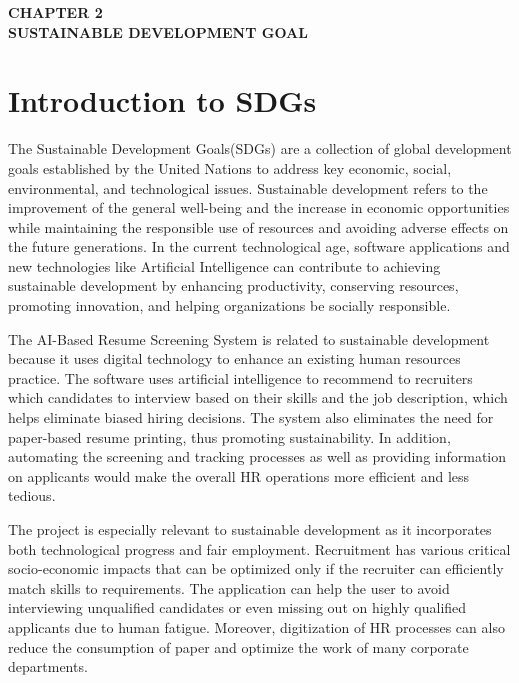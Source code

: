 \documentclass[12pt,a4paper]{report}
\begin{document}
\begin{center}
    {\fontsize{14pt}{17pt}\selectfont\textbf{CHAPTER 2}}\\[1cm]
    {\fontsize{14pt}{17pt}\selectfont\textbf{SUSTAINABLE DEVELOPMENT GOAL}}
\end{center}

\vspace*{\fill}

\clearpage

\section{Introduction to SDGs}
The Sustainable Development Goals(SDGs) are a collection of global development goals established by the United Nations to address key economic, social, environmental, and technological issues. Sustainable development refers to the improvement of the general well-being and the increase in economic opportunities while maintaining the responsible use of resources and avoiding adverse effects on the future generations. In the current technological age, software applications and new technologies like Artificial Intelligence can contribute to achieving sustainable development by enhancing productivity, conserving resources, promoting innovation, and helping organizations be socially responsible.

The AI-Based Resume Screening System is related to sustainable development because it uses digital technology to enhance an existing human resources practice. The software uses artificial intelligence to recommend to recruiters which candidates to interview based on their skills and the job description, which helps eliminate biased hiring decisions. The system also eliminates the need for paper-based resume printing, thus promoting sustainability. In addition, automating the screening and tracking processes as well as providing information on applicants would make the overall HR operations more efficient and less tedious.

The project is especially relevant to sustainable development as it incorporates both technological progress and fair employment. Recruitment has various critical socio-economic impacts that can be optimized only if the recruiter can efficiently match skills to requirements. The application can help the user to avoid interviewing unqualified candidates or even missing out on highly qualified applicants due to human fatigue. Moreover, digitization of HR processes can also reduce the consumption of paper and optimize the work of many corporate departments.
\end{document}
